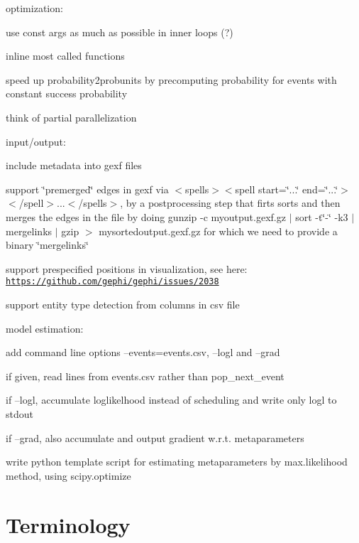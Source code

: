 optimization\+:
\begin{DoxyItemize}
\item use const args as much as possible in inner loops (?)
\item inline most called functions
\item speed up probability2probunits by precomputing probability for events with constant success probability
\item think of partial parallelization
\end{DoxyItemize}

input/output\+:
\begin{DoxyItemize}
\item include metadata into gexf files
\item support \char`\"{}premerged\char`\"{} edges in gexf via $<$spells$>$$<$spell start=\char`\"{}...\char`\"{} end=\char`\"{}...\char`\"{}$>$$<$/spell$>$...$<$/spells$>$, by a postprocessing step that firts sorts and then merges the edges in the file by doing {\ttfamily gunzip -\/c myoutput.\+gexf.\+gz $\vert$ sort -\/t\char`\"{}-\/\char`\"{} -\/k3 $\vert$ mergelinks $\vert$ gzip $>$ mysortedoutput.\+gexf.\+gz} for which we need to provide a binary \char`\"{}mergelinks\char`\"{}
\item support prespecified positions in visualization, see here\+: \href{https://github.com/gephi/gephi/issues/2038}{\tt https\+://github.\+com/gephi/gephi/issues/2038}
\item support entity type detection from columns in csv file
\end{DoxyItemize}

model estimation\+:
\begin{DoxyItemize}
\item add command line options --events=events.\+csv, --logl and --grad
\item if given, read lines from events.\+csv rather than pop\+\_\+next\+\_\+event
\item if --logl, accumulate loglikelhood instead of scheduling and write only logl to stdout
\item if --grad, also accumulate and output gradient w.\+r.\+t. metaparameters
\item write python template script for estimating metaparameters by max.\+likelihood method, using scipy.\+optimize
\end{DoxyItemize}

\section*{Terminology }


